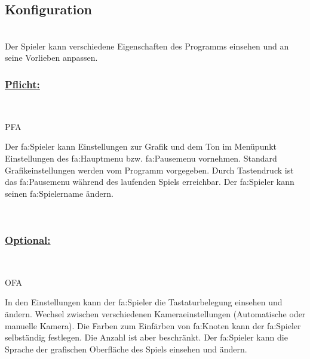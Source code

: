 %
%


\subsection{Konfiguration}

%
%
\renewcommand{\K}{}
%
%

~\\
Der Spieler kann verschiedene Eigenschaften des Programms einsehen und an seine Vorlieben anpassen.
\\

%
%
\subsubsection*{\underline{Pflicht:}}~\\

\begin{ids}{\gls{PFA\K}}

	\id[ 10] Der \gls{fa:Spieler} kann Einstellungen zur Grafik und dem Ton im Menüpunkt Einstellungen des \gls{fa:Hauptmenu} bzw. \gls{fa:Pausemenu} vornehmen.
 	\id[ 20] Standard Grafikeinstellungen werden vom Programm vorgegeben.
 	\id[ 30] Durch Tastendruck ist das \gls{fa:Pausemenu} während des laufenden Spiels erreichbar.
 	\id[ 40] Der \gls{fa:Spieler} kann seinen \gls{fa:Spielername} ändern.
 	
 	
	
\end{ids}

~\\


%
%
\subsubsection*{\underline{Optional:}}~\\


\begin{ids}{\gls{OFA\K}}

	\id[ 50] In den Einstellungen kann der \gls{fa:Spieler} die Tastaturbelegung einsehen und  ändern.
 	\id[60] Wechsel zwischen verschiedenen Kameraeinstellungen (Automatische oder manuelle Kamera).
 	\id[ 70] Die Farben zum Einfärben von \gls{fa:Knoten} kann der \gls{fa:Spieler} selbständig festlegen. Die Anzahl ist aber beschränkt.
 	\id[ 80] Der \gls{fa:Spieler} kann die Sprache der grafischen Oberfläche des Spiels einsehen und ändern.
 	
 	
	
\end{ids}

~\\